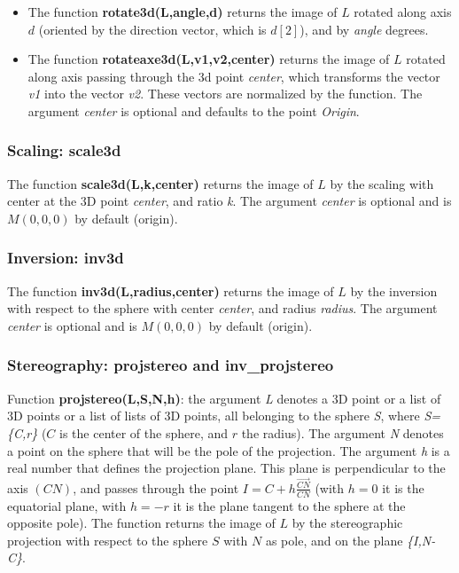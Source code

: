 \begin{itemize}
\item The function \textbf{rotate3d(L,angle,d)} returns the image of $L$ rotated along axis $d$ (oriented by the direction vector, which is $d[2]$), and by \emph{angle} degrees.
\item The function \textbf{rotateaxe3d(L,v1,v2,center)} returns the image of $L$ rotated along axis passing through the 3d point \emph{center}, which transforms the vector \emph{v1} into the vector \emph{v2}. These vectors are normalized by the function. The argument \emph{center} is optional and defaults to the point \emph{Origin}.
\end{itemize}

\subsubsection{Scaling: scale3d}

The function \textbf{scale3d(L,k,center)} returns the image of $L$ by the scaling with center at the 3D point \emph{center}, and ratio \emph{k}. The argument \emph{center} is optional and is $M(0,0,0)$ by default (origin).

\subsubsection{Inversion: inv3d}

The function \textbf{inv3d(L,radius,center)} returns the image of $L$ by the inversion with respect to the sphere with center \emph{center}, and radius \emph{radius}. The argument \emph{center} is optional and is $M(0,0,0)$ by default (origin).

\subsubsection{Stereography: projstereo and inv\_projstereo}

Function \textbf{projstereo(L,S,N,h)}: the argument \emph{L} denotes a 3D point or a list of 3D points or a list of lists of 3D points, all belonging to the sphere \emph{S}, where \emph{S=\{C,r\}} ($C$ is the center of the sphere, and $r$ the radius). The argument \emph{N} denotes a point on the sphere that will be the pole of the projection. The argument \emph{h} is a real number that defines the projection plane. This plane is perpendicular to the axis $(CN)$, and passes through the point $I=C+h \frac{\vec{CN}}{CN}$ (with $h=0$ it is the equatorial plane, with $h=-r$ it is the plane tangent to the sphere at the opposite pole). The function returns the image of $L$ by the stereographic projection with respect to the sphere $S$ with $N$ as pole, and on the plane \emph{\{I,N-C\}}.

